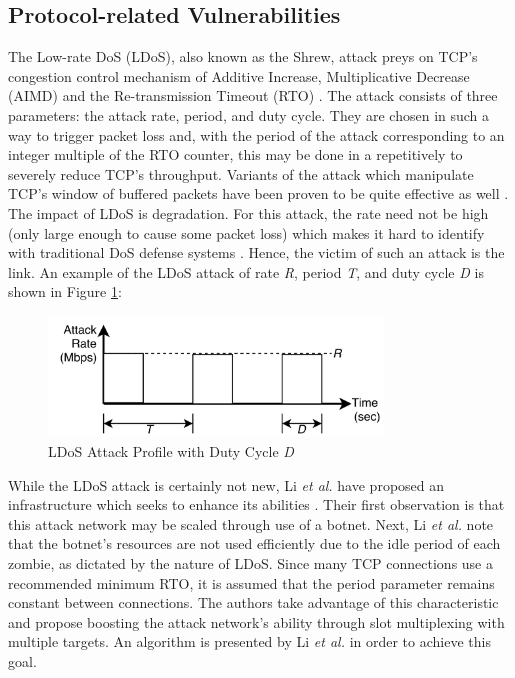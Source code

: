 \documentclass[conference]{IEEEtran}
\begin{document}
\subsection{Protocol-related Vulnerabilities}
The Low-rate DoS (LDoS), also known as the Shrew, attack preys on TCP's congestion control mechanism of Additive Increase, Multiplicative Decrease (AIMD) and the Re-transmission Timeout (RTO) \cite{Li:LAAEM}. The attack consists of three parameters: the attack rate, period, and duty cycle. They are chosen in such a way to trigger packet loss and, with the period of the attack corresponding to an integer multiple of the RTO counter, this may be done in a repetitively to severely reduce TCP's throughput. Variants of the attack which manipulate TCP's window of buffered packets have been proven to be quite effective as well \cite{Yue:shrew}. The impact of LDoS is degradation. For this attack, the rate need not be high (only large enough to cause some packet loss) which makes it hard to identify with traditional DoS defense systems \cite{Li:LAAEM}. Hence, the victim of such an attack is the link. An example of the LDoS attack of rate \textit{R}, period \textit{T}, and duty cycle \textit{D} is shown in Figure \ref{fig_ldosAttProf}:

\begin{figure}[!ht]
\centering
\includegraphics[width=3.5in]{LDoSAttProf}
\caption{LDoS Attack Profile with Duty Cycle \textit{D}}
\label{fig_ldosAttProf}
\end{figure}

While the LDoS attack is certainly not new, Li \textit{et al.} have proposed an infrastructure which seeks to enhance its abilities \cite{Li:LAAEM}. Their first observation is that this attack network may be scaled through use of a botnet. Next, Li \textit{et al.} note that the botnet's resources are not used efficiently due to the idle period of each zombie, as dictated by the nature of LDoS. Since many TCP connections use a recommended minimum RTO, it is assumed that the period parameter remains constant between connections. The authors take advantage of this characteristic and propose boosting the attack network's ability through slot multiplexing with multiple targets. An algorithm is presented by Li \textit{et al.} in order to achieve this goal.
\end{document}
